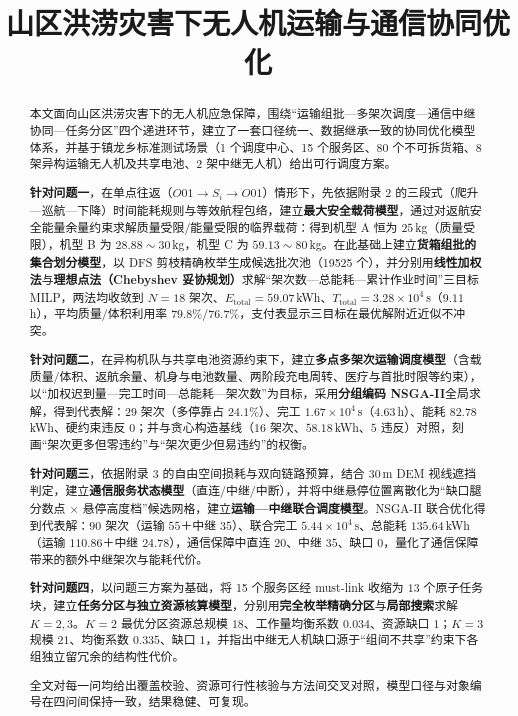 \documentclass[bwprint]{gmcmthesis}
\title{山区洪涝灾害下无人机运输与通信协同优化}
\begin{document}
\maketitle

\begin{abstract}

本文面向山区洪涝灾害下的无人机应急保障，围绕“运输组批—多架次调度—通信中继协同—任务分区”四个递进环节，建立了一套口径统一、数据继承一致的协同优化模型体系，并基于镇龙乡标准测试场景（1 个调度中心、15 个服务区、80 个不可拆货箱、8 架异构运输无人机及共享电池、2 架中继无人机）给出可行调度方案。

\textbf{针对问题一}，在单点往返（$O01\to S_i\to O01$）情形下，先依据附录 2 的三段式（爬升—巡航—下降）时间能耗规则与等效航程包络，建立\textbf{最大安全载荷模型}，通过对返航安全能量余量约束求解质量受限/能量受限的临界载荷：得到机型 A 恒为 $25\,$kg（质量受限），机型 B 为 $28.88\!\sim\!30\,$kg，机型 C 为 $59.13\!\sim\!80\,$kg。在此基础上建立\textbf{货箱组批的集合划分模型}，以 DFS 剪枝精确枚举生成候选批次池（19525 个），并分别用\textbf{线性加权法}与\textbf{理想点法（Chebyshev 妥协规划）}求解“架次数—总能耗—累计作业时间”三目标 MILP，两法均收敛到 $N=18$ 架次、$E_{\text{total}}=59.07\,$kWh、$T_{\text{total}}=3.28\times10^{4}\,$s（$9.11\,$h），平均质量/体积利用率 $79.8\%/76.7\%$，支付表显示三目标在最优解附近近似不冲突。

\textbf{针对问题二}，在异构机队与共享电池资源约束下，建立\textbf{多点多架次运输调度模型}（含载质量/体积、返航余量、机身与电池数量、两阶段充电周转、医疗与首批时限等约束），以“加权迟到量—完工时间—总能耗—架次数”为目标，采用\textbf{分组编码 NSGA-II}全局求解，得到代表解：$29$ 架次（多停靠占 $24.1\%$）、完工 $1.67\times10^{4}\,$s（$4.63\,$h）、能耗 $82.78\,$kWh、硬约束违反 $0$；并与贪心构造基线（$16$ 架次、$58.18\,$kWh、$5$ 违反）对照，刻画“架次更多但零违约”与“架次更少但易违约”的权衡。

\textbf{针对问题三}，依据附录 3 的自由空间损耗与双向链路预算，结合 $30\,$m DEM 视线遮挡判定，建立\textbf{通信服务状态模型}（直连/中继/中断），并将中继悬停位置离散化为“缺口腿分数点 $\times$ 悬停高度档”候选网格，建立\textbf{运输—中继联合调度模型}。NSGA-II 联合优化得到代表解：$90$ 架次（运输 $55$＋中继 $35$）、联合完工 $5.44\times10^{4}\,$s、总能耗 $135.64\,$kWh（运输 $110.86$＋中继 $24.78$），通信保障中直连 $20$、中继 $35$、缺口 $0$，量化了通信保障带来的额外中继架次与能耗代价。

\textbf{针对问题四}，以问题三方案为基础，将 15 个服务区经 must-link 收缩为 $13$ 个原子任务块，建立\textbf{任务分区与独立资源核算模型}，分别用\textbf{完全枚举精确分区}与\textbf{局部搜索}求解 $K=2,3$。$K=2$ 最优分区资源总规模 $18$、工作量均衡系数 $0.034$、资源缺口 $1$；$K=3$ 规模 $21$、均衡系数 $0.335$、缺口 $1$，并指出中继无人机缺口源于“组间不共享”约束下各组独立留冗余的结构性代价。

全文对每一问均给出覆盖校验、资源可行性核验与方法间交叉对照，模型口径与对象编号在四问间保持一致，结果稳健、可复现。

\end{abstract}
\end{document}
